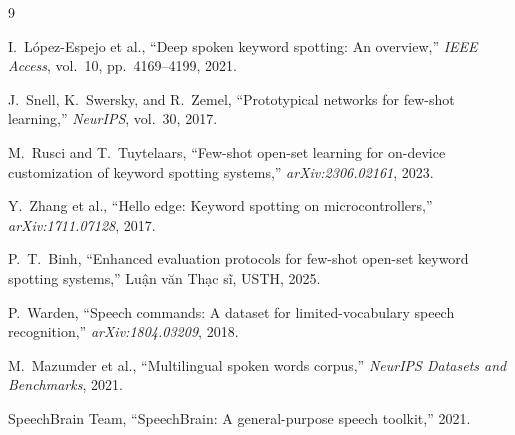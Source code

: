 \documentclass[12pt,a4paper]{report}
\begin{document}
\begin{thebibliography}{9}

I.~L{\'o}pez-Espejo et al.,
``Deep spoken keyword spotting: An overview,''
\textit{IEEE Access}, vol.~10, pp.~4169--4199, 2021.

J.~Snell, K.~Swersky, and R.~Zemel,
``Prototypical networks for few-shot learning,''
\textit{NeurIPS}, vol.~30, 2017.

M.~Rusci and T.~Tuytelaars,
``Few-shot open-set learning for on-device customization of keyword spotting
systems,''
\textit{arXiv:2306.02161}, 2023.

Y.~Zhang et al.,
``Hello edge: Keyword spotting on microcontrollers,''
\textit{arXiv:1711.07128}, 2017.

P.~T.~Binh,
``Enhanced evaluation protocols for few-shot open-set keyword spotting systems,''
Luận văn Thạc sĩ, USTH, 2025.

P.~Warden,
``Speech commands: A dataset for limited-vocabulary speech recognition,''
\textit{arXiv:1804.03209}, 2018.

M.~Mazumder et al.,
``Multilingual spoken words corpus,''
\textit{NeurIPS Datasets and Benchmarks}, 2021.

SpeechBrain Team,
``SpeechBrain: A general-purpose speech toolkit,'' 2021.

\end{thebibliography}
\end{document}
